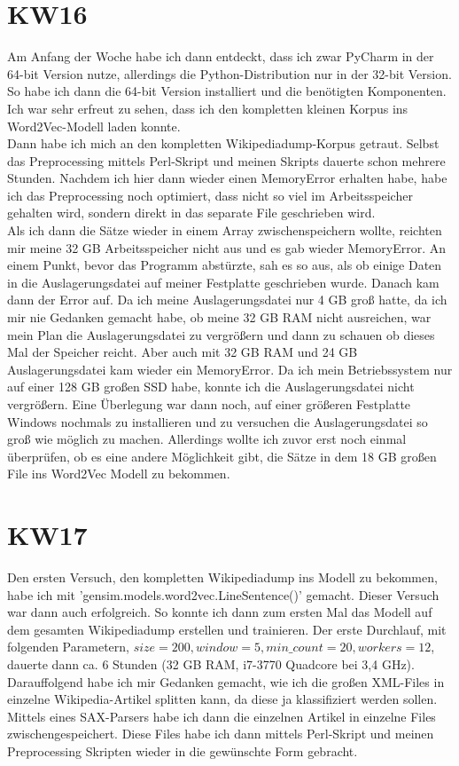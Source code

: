 \documentclass[11pt,a4paper]{article}
\begin{document}
\section*{KW16}
Am Anfang der Woche habe ich dann entdeckt, dass ich zwar PyCharm in der 64-bit Version nutze, allerdings die Python-Distribution nur in der 32-bit Version. So habe ich dann die 64-bit Version installiert und die benötigten Komponenten. Ich war sehr erfreut zu sehen, dass ich den kompletten kleinen Korpus ins Word2Vec-Modell laden konnte. 
\\Dann habe ich mich an den kompletten Wikipediadump-Korpus getraut. Selbst das Preprocessing mittels Perl-Skript und meinen Skripts dauerte schon mehrere Stunden. Nachdem ich hier dann wieder einen MemoryError erhalten habe, habe ich das Preprocessing noch optimiert, dass nicht so viel im Arbeitsspeicher gehalten wird, sondern direkt in das separate File geschrieben wird.
\\Als ich dann die Sätze wieder in einem Array zwischenspeichern wollte, reichten mir meine 32 GB Arbeitsspeicher nicht aus und es gab wieder MemoryError. An einem Punkt, bevor das Programm abstürzte, sah es so aus, als ob einige Daten in die Auslagerungsdatei auf meiner Festplatte geschrieben wurde. Danach kam dann der Error auf. Da ich meine Auslagerungsdatei nur 4 GB groß hatte, da ich mir nie Gedanken gemacht habe, ob meine 32 GB RAM nicht ausreichen, war mein Plan die Auslagerungsdatei zu vergrößern und dann zu schauen ob dieses Mal der Speicher reicht. Aber auch mit 32 GB RAM und 24 GB Auslagerungsdatei kam wieder ein MemoryError. Da ich mein Betriebssystem nur auf einer 128 GB großen SSD habe, konnte ich die Auslagerungsdatei nicht vergrößern. Eine Überlegung war dann noch, auf einer größeren Festplatte Windows nochmals zu installieren und zu versuchen die Auslagerungsdatei so groß wie möglich zu machen. Allerdings wollte ich zuvor erst noch einmal überprüfen, ob es eine andere Möglichkeit gibt, die Sätze in dem 18 GB großen File ins Word2Vec Modell zu bekommen.

\section*{KW17}
Den ersten Versuch, den kompletten Wikipediadump ins Modell zu bekommen, habe ich mit 'gensim.models.word2vec.LineSentence()' gemacht. Dieser Versuch war dann auch erfolgreich. So konnte ich dann zum ersten Mal das Modell auf dem gesamten Wikipediadump erstellen und trainieren. Der erste Durchlauf, mit folgenden Parametern, $size=200, window=5, min\_count=20, workers=12$, dauerte dann ca. 6 Stunden (32 GB RAM, i7-3770 Quadcore bei 3,4 GHz). 
\\Darauffolgend habe ich mir Gedanken gemacht, wie ich die großen XML-Files in einzelne Wikipedia-Artikel splitten kann, da diese ja klassifiziert werden sollen. Mittels eines SAX-Parsers habe ich dann die einzelnen Artikel in einzelne Files zwischengespeichert. Diese Files habe ich dann mittels Perl-Skript und meinen Preprocessing Skripten wieder in die gewünschte Form gebracht.\\
\end{document}
